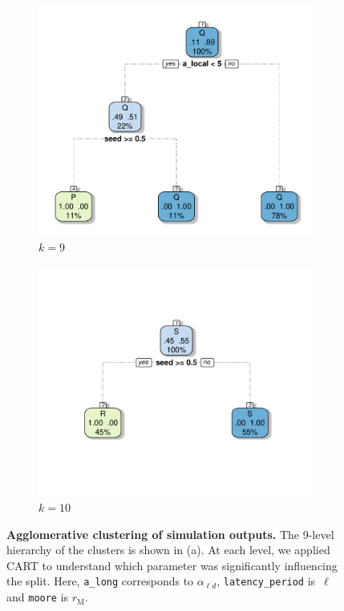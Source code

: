 \documentclass[10pt]{article}
\newcommand{\ald}{\alpha_{\ell d}}
\newcommand{\mooreRange}{r_\mathrm{M}}
\theoremstyle{definition}
\begin{document}
\begin{figure}[ht]
\begin{subfigure}[b]{.32\textwidth}
\includegraphics[width=\textwidth]{../clustering/results/agglomerative/cart_cPQ_agg.pdf}
\caption{$k=9$}
\end{subfigure}
\begin{subfigure}[b]{.32\textwidth}
\includegraphics[width=\textwidth]{../clustering/results/agglomerative/cart_cRS_agg.pdf}
\caption{$k=10$}
\end{subfigure}
\caption{\textbf{Agglomerative clustering of simulation outputs.} The
9-level hierarchy of the clusters is shown in (a). At each level, we
applied CART to understand which parameter was significantly influencing
the split. Here, \texttt{a\_long} corresponds to $\ald$,
\texttt{latency\_period} is~$\ell$ and \texttt{moore} is $\mooreRange$.
\label{fig:cartSpread}}
\end{figure}
\end{document}
